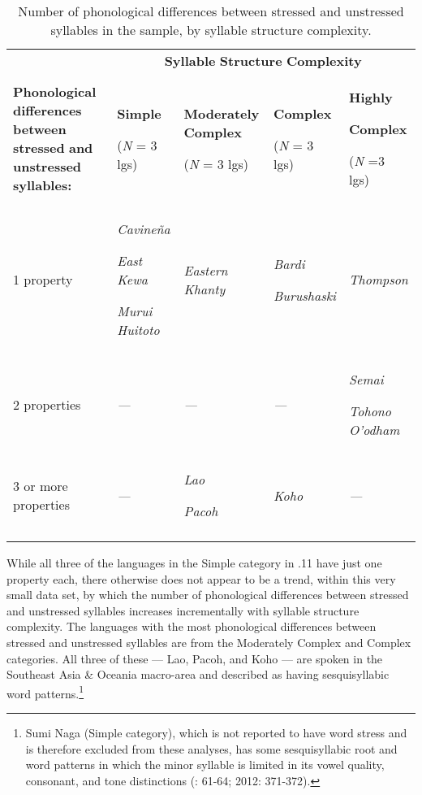 \begin{table}
\begin{tabularx}{\textwidth}{XXXXX}
\lsptoprule
 & \multicolumn{4}{c}{ \textbf{Syllable} \textbf{Structure} \textbf{Complexity}}\\
 \textbf{Phonological} \textbf{differences} \textbf{between} \textbf{stressed} \textbf{and} \textbf{unstressed} \textbf{syllables:} & { \textbf{Simple}}

 (\textit{N} = 3 lgs) & { \textbf{Moderately} \textbf{Complex}}

 (\textit{N} = 3 lgs) & { \textbf{Complex}}

 (\textit{N} = 3 lgs) & { \textbf{Highly} }

{ \textbf{Complex}}

 (\textit{N} =3 lgs)\\
 1 property & { \textit{Cavineña}}

{ \textit{East} \textit{Kewa}}

 \textit{Murui} \textit{Huitoto} & \textit{Eastern} \textit{Khanty} & { \textit{Bardi}}

 \textit{Burushaski} & \textit{Thompson}\\
 2 properties & \textit{—} & \textit{—} & \textit{—} & { \textit{Semai}}

 \textit{Tohono} \textit{O’odham}\\
 3 or more properties & \textit{—} & { \textit{Lao}}

 \textit{Pacoh} & \textit{Koho} & \textit{—}\\
\lspbottomrule
\end{tabularx}
\caption{\label{5.11}Number of phonological differences between stressed and unstressed syllables in the sample, by syllable structure complexity.}
\end{table}




  While all three of the languages in the Simple category in .11 have just one property each, there otherwise does not appear to be a trend, within this very small data set, by which the number of phonological differences between stressed and unstressed syllables increases incrementally with syllable structure complexity. The languages with the most phonological differences between stressed and unstressed syllables are from the Moderately Complex and Complex categories. All three of these — Lao, Pacoh, and Koho — are spoken in the Southeast Asia \& Oceania macro-area and described as having sesquisyllabic word patterns.\footnote{ \textrm{Sumi Naga (Simple category), which is not reported to have word stress and is therefore excluded from these analyses, has some sesquisyllabic root and word patterns in which the minor syllable is limited in its vowel quality, consonant, and tone distinctions (\citealt{Teo2009}: 61-64; 2012: 371-372).}} 



